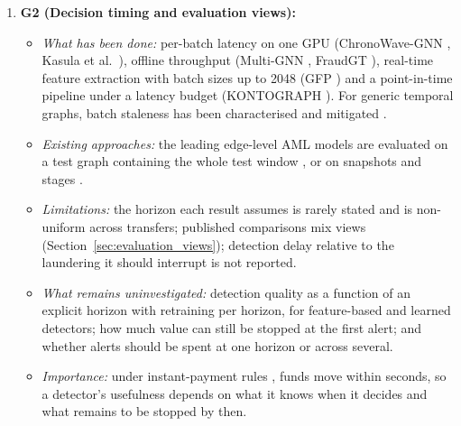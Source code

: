 \documentclass[11pt,a4paper]{article}
\begin{document}
\begin{enumerate}[leftmargin=*]
    \item \textbf{G2 (Decision timing and evaluation views):}
    \begin{itemize}[leftmargin=*]
        \item \textit{What has been done:} per-batch latency on one GPU (ChronoWave-GNN \cite{lin2026chronowave}, Kasula et al.\ \cite{kasula2025ajk}), offline throughput (Multi-GNN \cite{egressy2024multigraph}, FraudGT \cite{lin2024fraudgt}), real-time feature extraction with batch sizes up to 2048 (GFP \cite{blanusa2024gfp}) and a point-in-time pipeline under a latency budget (KONTOGRAPH \cite{abolfadl2026kontograph}). For generic temporal graphs, batch staleness has been characterised and mitigated \cite{su2024pres,zhou2025badgnn,anchorrm2026,streamtgn2026}.
        \item \textit{Existing approaches:} the leading edge-level AML models are evaluated on a test graph containing the whole test window \cite{egressy2024multigraph,bilgi2026mega,lin2024fraudgt}, or on snapshots and stages \cite{tian2025kar,jia2025lmae4eth,rico2026taml,lin2026chronowave}.
        \item \textit{Limitations:} the horizon each result assumes is rarely stated and is non-uniform across transfers; published comparisons mix views (Section~\ref{sec:evaluation_views}); detection delay relative to the laundering it should interrupt is not reported.
        \item \textit{What remains uninvestigated:} detection quality as a function of an explicit horizon with retraining per horizon, for feature-based and learned detectors; how much value can still be stopped at the first alert; and whether alerts should be spent at one horizon or across several.
        \item \textit{Importance:} under instant-payment rules \cite{eu2024instant}, funds move within seconds, so a detector's usefulness depends on what it knows when it decides and what remains to be stopped by then.
    \end{itemize}


\end{enumerate}
\end{document}
